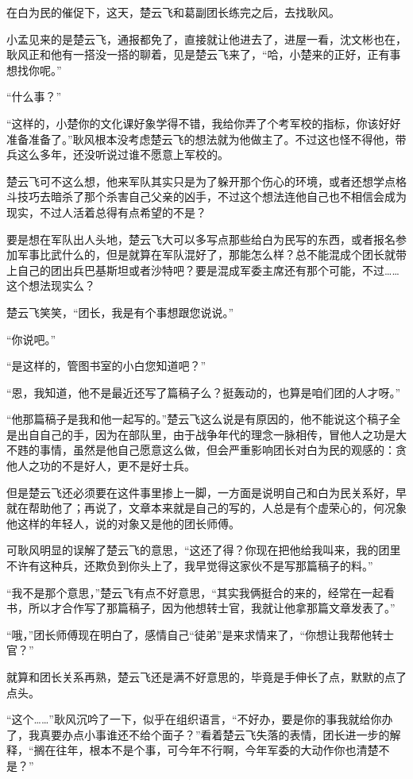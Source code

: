 在白为民的催促下，这天，楚云飞和葛副团长练完之后，去找耿风。

小孟见来的是楚云飞，通报都免了，直接就让他进去了，进屋一看，沈文彬也在，耿风正和他有一搭没一搭的聊着，见是楚云飞来了，“哈，小楚来的正好，正有事想找你呢。”

“什么事？”

“这样的，小楚你的文化课好象学得不错，我给你弄了个考军校的指标，你该好好准备准备了。”耿风根本没考虑楚云飞的想法就为他做主了。不过这也怪不得他，带兵这么多年，还没听说过谁不愿意上军校的。

楚云飞可不这么想，他来军队其实只是为了躲开那个伤心的环境，或者还想学点格斗技巧去暗杀了那个杀害自己父亲的凶手，不过这个想法连他自己也不相信会成为现实，不过人活着总得有点希望的不是？

要是想在军队出人头地，楚云飞大可以多写点那些给白为民写的东西，或者报名参加军事比武什么的，但是就算在军队混好了，那能怎么样？总不能混成个团长就带上自己的团出兵巴基斯坦或者沙特吧？要是混成军委主席还有那个可能，不过……这个想法现实么？

楚云飞笑笑，“团长，我是有个事想跟您说说。”

“你说吧。”

“是这样的，管图书室的小白您知道吧？”

“恩，我知道，他不是最近还写了篇稿子么？挺轰动的，也算是咱们团的人才呀。”

“他那篇稿子是我和他一起写的。”楚云飞这么说是有原因的，他不能说这个稿子全是出自自己的手，因为在部队里，由于战争年代的理念一脉相传，冒他人之功是大不韪的事情，虽然是他自己愿意这么做，但会严重影响团长对白为民的观感的：贪他人之功的不是好人，更不是好士兵。

但是楚云飞还必须要在这件事里掺上一脚，一方面是说明自己和白为民关系好，早就在帮助他了；再说了，文章本来就是自己的写的，人总是有个虚荣心的，何况象他这样的年轻人，说的对象又是他的团长师傅。

可耿风明显的误解了楚云飞的意思，“这还了得？你现在把他给我叫来，我的团里不许有这种兵，还欺负到你头上了，我早觉得这家伙不是写那篇稿子的料。”

“我不是那个意思，”楚云飞有点不好意思，“其实我俩挺合的来的，经常在一起看书，所以才合作写了那篇稿子，因为他想转士官，我就让他拿那篇文章发表了。”

“哦，”团长师傅现在明白了，感情自己“徒弟”是来求情来了，“你想让我帮他转士官？”

就算和团长关系再熟，楚云飞还是满不好意思的，毕竟是手伸长了点，默默的点了点头。

“这个……”耿风沉吟了一下，似乎在组织语言，“不好办，要是你的事我就给你办了，我真要办点小事谁还不给个面子？”看着楚云飞失落的表情，团长进一步的解释，“搁在往年，根本不是个事，可今年不行啊，今年军委的大动作你也清楚不是？”

